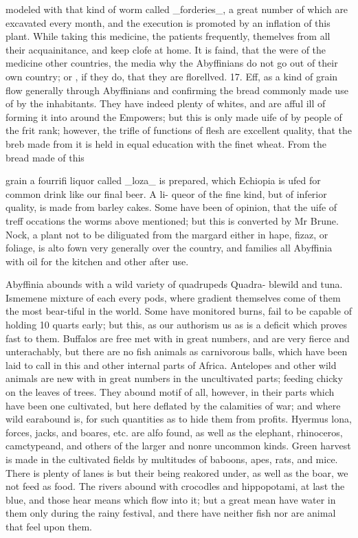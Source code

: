modeled with that kind of worm called \_forderies\_, a great number of which are excavated every month, and the execution is promoted by an inflation of this plant. While taking this medicine, the patients frequently, themelves from all their acquainitance, and keep clofe at home. It is faind, that the were of the medicine other countries, the media why the Abyffinians do not go out of their own country; or , if they do, that they are florellved. 17. Eff, as a kind of grain flow generally through Abyffinians and confirming the bread commonly made use of by the inhabitants. They have indeed plenty of whites, and are afful ill of forming it into around the Empowers; but this is only made uife of by people of the frit rank; however, the trifle of functions of flesh are excellent quality, that the breb made from it is held in equal education with the finet wheat. From the bread made of this\par\medskip
grain a fourrifi liquor called \_loza\_ is prepared, which Echiopia is ufed for common drink like our final beer. A li- queor of the fine kind, but of inferior quality, is made from barley cakes. Some have been of opinion, that the uife of treff occations the worms above mentioned; but this is converted by Mr Brune. Nock, a plant not to be diliguated from the margard either in hape, fizaz, or foliage, is alto fown very generally over the country, and families all Abyffinia with oil for the kitchen and other after use.\par\medskip
Abyffinia abounds with a wild variety of quadrupeds Quadra- blewild and tuna. Ismemene mixture of each every pods, where gradient themselves come of them the most bear-tiful in the world. Some have monitored burns, fail to be capable of holding 10 quarts early; but this, as our authorism us as is a deficit which proves fast to them. Buffalos are free met with in great numbers, and are very fierce and unterachably, but there are no fish animals as carnivorous balls, which have been laid to call in this and other internal parts of Africa. Antelopes and other wild animals are new with in great numbers in the uncultivated parts; feeding chicky on the leaves of trees. They abound motif of all, however, in their parts which have been one cultivated, but here deflated by the calamities of war; and where wild earabound is, for such quantities as to hide them from profits. Hyermus lona, forces, jacks, and boares, etc. are alfo found, as well as the elephant, rhinoceros, camctypeand, and others of the larger and nonre uncommon kinds. Green harvest is made in the cultivated fields by multitudes of baboons, apes, rats, and mice. There is plenty of lanes is but their being reakored under, as well as the boar, we not feed as food. The rivers abound with crocodles and hippopotami, at last the blue, and those hear means which flow into it; but a great mean have water in them only during the rainy festival, and there have neither fish nor are animal that feel upon them.\par\medskip

